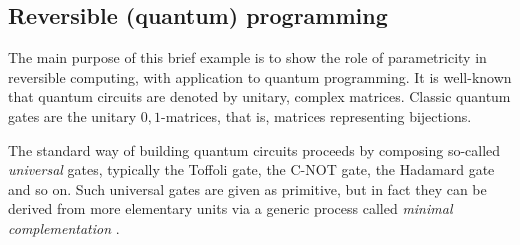\documentclass[sigplan]{acmart}\settopmatter{}
\def\comp{ \mathbin{\cdot} }
\begin{document}

\subsection{Reversible (quantum) programming}
The main purpose of this brief example is to show the role of parametricity in reversible computing, with application to quantum programming. It is well-known that quantum circuits are denoted by unitary, complex matrices. Classic quantum gates are the unitary \ensuremath{\mathrm{0},\mathrm{1}}-matrices, that is, matrices representing bijections.

The standard way of building quantum circuits proceeds by composing so-called \emph{universal} gates, typically the Toffoli gate, the C-NOT gate, the Hadamard gate and so on. Such universal gates are given as primitive, but in fact they can be derived from more elementary units via a generic process called \emph{minimal complementation} \cite{Ol18}.
\end{document}
